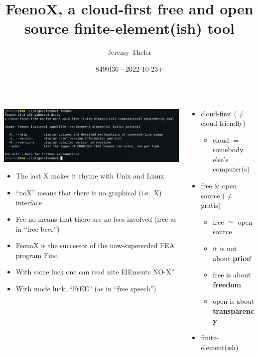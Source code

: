 \documentclass[
  ignorenonframetext,
  aspectratio=169,
]{beamer}
\title{FeenoX, a cloud-first free and open source finite-element(ish)
tool}
\author{Jeremy Theler}
\date{8499f36---2022-10-23+}
\providecommand{\tightlist}{%
  \setlength{\itemsep}{0pt}\setlength{\parskip}{0pt}}
\begin{document}
\frame{\titlepage}

\begin{frame}{}
\protect\hypertarget{section}{}
\begin{columns}[T]
\begin{column}{0.6\textwidth}
\includegraphics{feenox-console.png}

\begin{itemize}
\tightlist
\item
  The last X makes it rhyme with Unix and Linux.
\item
  ``noX'' means that there is no graphical (i.e.~X) interface
\item
  Fee-no means that there are no fees involved (free as in ``free
  beer'')
\item
  FeenoX is the successor of the now-superseded FEA program Fino
\item
  With some luck one can read nite ElEments NO-X''
\item
  With mode luck, ``FrEE'' (as in ``free speech'')
\end{itemize}
\end{column}

\begin{column}{0.4\textwidth}
\begin{itemize}
\tightlist
\item
  cloud-first (\(\neq\) cloud-friendly)

  \begin{itemize}
  \tightlist
  \item
    cloud \(=\) somebody else's computer(s)
  \end{itemize}
\item
  free \& open source (\(\neq\) gratis)

  \begin{itemize}
  \tightlist
  \item
    free \(\simeq\) open source
  \item
    it is not about \textbf{price}!
  \item
    free is about \textbf{freedom}
  \item
    open is about \textbf{transparency}
  \end{itemize}
\item
  finite-element(ish)


\end{itemize}
\end{column}
\end{columns}
\end{frame}
\end{document}
